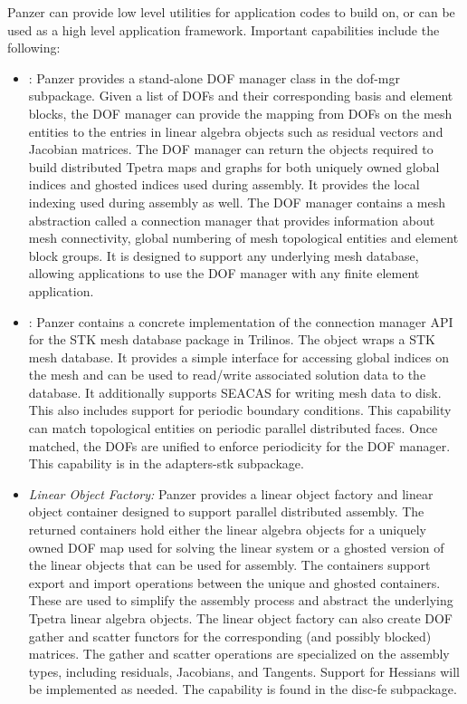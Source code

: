 Panzer can provide low level utilities for application codes to build on, or can be used as a high level application framework. Important capabilities include the following:
\begin{itemize}
\item {}: Panzer provides a stand-alone DOF manager class in the dof-mgr subpackage. Given a list of DOFs and their corresponding basis and element blocks, the DOF manager can provide the mapping from DOFs on the mesh entities to the entries in linear algebra objects such as residual vectors and Jacobian matrices. The DOF manager can return the objects required to build distributed Tpetra 
maps and graphs for both uniquely owned global indices and ghosted indices used during assembly. 
It provides the local indexing used during assembly as well. The DOF manager contains a mesh abstraction called a connection manager that provides information about mesh connectivity, global numbering of mesh topological entities and element block groups. It is designed to support any underlying mesh database, allowing applications to use the DOF manager with any finite element application.
\item {}: Panzer contains a concrete implementation of the connection manager API for the STK mesh database package in Trilinos. The  object wraps a STK mesh database. It provides a simple interface for accessing global indices on the mesh and can be used to read/write associated solution data to the database. It additionally supports SEACAS for writing mesh data to disk. This  also includes support for periodic boundary conditions.  This capability can match topological entities on periodic parallel distributed faces. Once matched, the DOFs are unified to enforce periodicity for the DOF manager. This capability is in the adapters-stk subpackage.
\item \emph{Linear Object Factory:} Panzer provides a linear object factory and linear object container designed to support parallel distributed assembly. 
The returned containers hold either the linear algebra objects for a uniquely owned DOF map used for solving the linear system or a ghosted version of the linear objects that can be used for assembly. The containers support export and import operations between the unique and ghosted containers. These are used to simplify the assembly process and abstract the underlying Tpetra linear algebra objects. %
The linear object factory can also create DOF gather and scatter functors for the corresponding (and possibly blocked) matrices. The gather and scatter operations are specialized on the assembly types, including residuals, Jacobians, and Tangents.
Support for Hessians will be implemented as needed.
The capability is found in the disc-fe subpackage.


\end{itemize}
